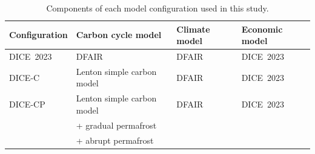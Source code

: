 
\begin{table}[htbp]
\centering
\caption{Components of each model configuration used in this study.}
\label{tab:model_configs}
\begin{tabular}{llll}
\toprule
\textbf{Configuration}
    & \textbf{Carbon cycle model}
    & \textbf{Climate model}
    & \textbf{Economic model} \\
\midrule
DICE~2023
    & DFAIR \citep{barrage_nordhaus_2024}
    & DFAIR \citep{barrage_nordhaus_2024}
    & DICE~2023 \citep{barrage_nordhaus_2024} \\[4pt]
DICE-C
    & Lenton simple carbon model \citep{lenton_2000}
    & DFAIR \citep{barrage_nordhaus_2024}
    & DICE~2023 \citep{barrage_nordhaus_2024} \\[4pt]
DICE-CP
    & Lenton simple carbon model \citep{lenton_2000}
    & DFAIR \citep{barrage_nordhaus_2024}
    & DICE~2023 \citep{barrage_nordhaus_2024} \\
    & \quad + gradual permafrost \citep{woodard_2021}
    & &  \\
    & \quad + abrupt permafrost \citep{armstrong_mckay_2022}
    & &  \\
\bottomrule
\end{tabular}
\end{table}
